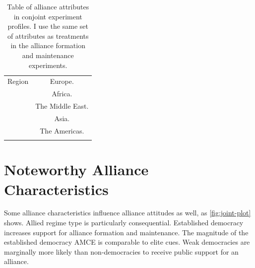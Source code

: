 \documentclass[12pt]{article}
\begin{document}
\begin{table}[htpb]
\begin{center}
\begin{adjustbox}{width = .85\textwidth}
\begin{tabular}{lc}
Region              & Europe. \\ 
                    & Africa. \\
                    & The Middle East. \\ 
                    & Asia. \\   
                    & The Americas. \\ 
                                                                            
\hline \\
\end{tabular}
\end{adjustbox}
\end{center}
\caption{Table of alliance attributes in conjoint experiment profiles. I use the same set of attributes as treatments in the alliance formation and maintenance experiments.} 
\label{tab:conjoint-vars}
\end{table}

\newpage

\section{Noteworthy Alliance Characteristics}

Some alliance characteristics influence alliance attitudes as well, as \autoref{fig:joint-plot} shows. 
Allied regime type is particularly consequential. 
Established democracy increases support for alliance formation and maintenance.
The magnitude of the established democracy AMCE is comparable to elite cues.   
Weak democracies are marginally more likely than non-democracies to receive public support for an alliance.
\end{document}
